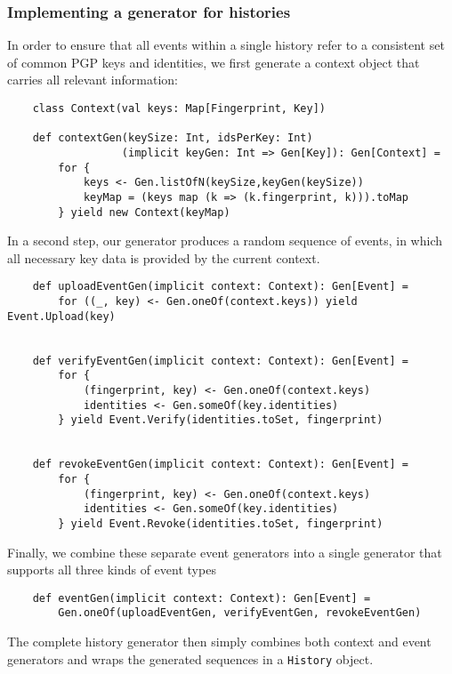 \subsubsection{Implementing a generator for histories}
In order to ensure that all events within a single history refer to a consistent set of common PGP keys and identities, we first generate a context object that carries all relevant information: 

\begin{verbatim}
    class Context(val keys: Map[Fingerprint, Key])

    def contextGen(keySize: Int, idsPerKey: Int)
                  (implicit keyGen: Int => Gen[Key]): Gen[Context] = 
        for {
            keys <- Gen.listOfN(keySize,keyGen(keySize))
            keyMap = (keys map (k => (k.fingerprint, k))).toMap
        } yield new Context(keyMap)
\end{verbatim}

In a second step, our generator produces a random sequence of events, in which all necessary key data is provided by the current context.

\begin{verbatim}
    def uploadEventGen(implicit context: Context): Gen[Event] =
        for ((_, key) <- Gen.oneOf(context.keys)) yield Event.Upload(key)


    def verifyEventGen(implicit context: Context): Gen[Event] =
        for {
            (fingerprint, key) <- Gen.oneOf(context.keys)
            identities <- Gen.someOf(key.identities)
        } yield Event.Verify(identities.toSet, fingerprint)


    def revokeEventGen(implicit context: Context): Gen[Event] =
        for {
            (fingerprint, key) <- Gen.oneOf(context.keys)
            identities <- Gen.someOf(key.identities)
        } yield Event.Revoke(identities.toSet, fingerprint)
\end{verbatim}

Finally, we combine these separate event generators into a single generator that supports all three kinds of event types

\begin{verbatim}
    def eventGen(implicit context: Context): Gen[Event] =
        Gen.oneOf(uploadEventGen, verifyEventGen, revokeEventGen)
\end{verbatim}

The complete history generator then simply combines both context and event generators and wraps the generated sequences in a \texttt{History} object.

